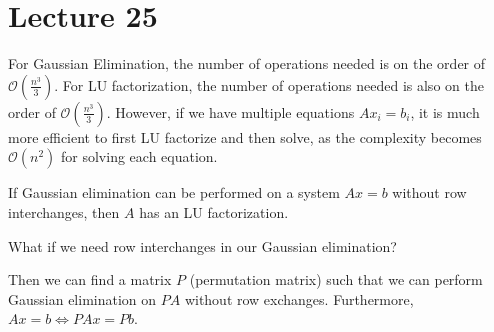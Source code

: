 \documentclass[class=article, crop=false]{standalone}
\begin{document}
  \section{Lecture 25}
  For Gaussian Elimination, the number of operations needed is on the order of $\mathcal{O}(\frac{n^3}{3})$. For LU factorization, the number of operations needed is also on the order of $\mathcal{O}(\frac{n^3}{3})$. However, if we have multiple equations $Ax_i = b_i$, it is much more efficient to first LU factorize and then solve, as the complexity becomes $\mathcal{O}(n^2)$ for solving each equation.
  \begin{theorem}{}
    If Gaussian elimination can be performed on a system $Ax = b$ without row interchanges, then $A$ has an LU factorization.
  \end{theorem}
  What if we need row interchanges in our Gaussian elimination? \par
  Then we can find a matrix $P$ (permutation matrix) such that we can perform Gaussian elimination on $PA$ without row exchanges. Furthermore, $Ax = b \iff PAx = Pb$.
\end{document}
